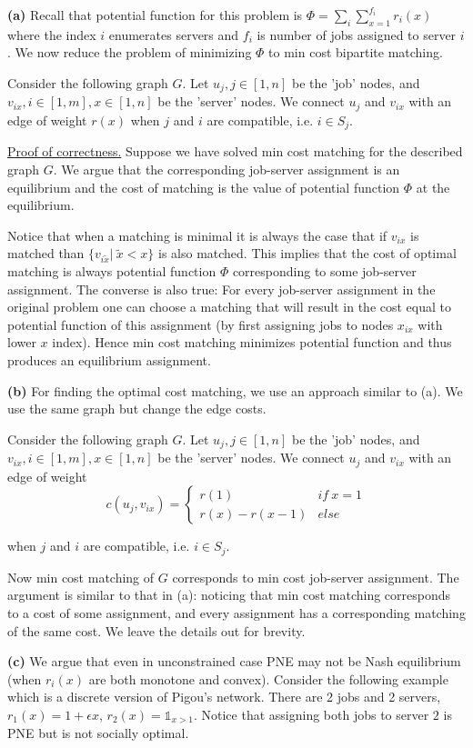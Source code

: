 \textbf{(a)} Recall that potential function for this problem is $\Phi = \sum_i \sum_{x=1}^{f_i}r_i(x)$ where the index $i$ enumerates servers and $f_i$ is number of jobs assigned to server $i$. We now reduce the problem of minimizing $\Phi$ to min cost bipartite matching.

Consider the following graph $G$. Let $u_j,j\in[1,n]$ be the 'job' nodes, and $v_{ix},i\in[1,m],x\in[1,n]$ be the 'server' nodes. We connect $u_j$ and $v_{ix}$ with an edge of weight $r(x)$ when $j$ and $i$ are compatible, i.e. $i\in S_j$. 

\uline{Proof of correctness.} Suppose we have solved min cost matching for the described graph $G$. We argue that the corresponding job-server assignment is an equilibrium and the cost of matching is the value of potential function $\Phi$ at the equilibrium.  

Notice that when a matching is minimal it is always the case that if $v_{ix}$ is matched than $\{v_{i\tilde x}|\ \tilde x<x\}$ is also matched. This implies that the cost of optimal matching is always potential function $\Phi$ corresponding to some job-server assignment. The converse is also true: For every job-server assignment in the original problem one can choose a matching that will result in the cost equal to potential function of this assignment (by first assigning jobs to nodes $x_{ix}$ with lower $x$ index). Hence min cost matching minimizes potential function and thus produces an equilibrium assignment.

\textbf{(b)} For finding the optimal cost matching, we use an approach similar to (a). We use the same graph but change the edge costs.

Consider the following graph $G$. Let $u_j,j\in[1,n]$ be the 'job' nodes, and $v_{ix},i\in[1,m],x\in[1,n]$ be the 'server' nodes. We connect $u_j$ and $v_{ix}$ with an edge of weight $$ c(u_j,v_{ix})=\begin{cases} r(1)\qquad &if\ x=1 \\ r(x)-r(x-1) &else \end{cases}$$ 


when $j$ and $i$ are compatible, i.e. $i\in S_j$. 

Now min cost matching of $G$ corresponds to min cost job-server assignment. The argument is similar to that in (a): noticing that min cost matching corresponds to a cost of some assignment, and every assignment has a corresponding matching of the same cost. We leave the details out for brevity.

\textbf{(c)} We argue that even in unconstrained case PNE may not be Nash equilibrium (when $r_i(x)$ are both monotone and convex). Consider the following example which is a discrete version of Pigou's network. There are 2 jobs and 2 servers, $r_1(x)=1+\epsilon x$, $r_2(x) = \mathbb{1}_{x>1}$. Notice that assigning both jobs to server $2$ is PNE but is not socially optimal. 

